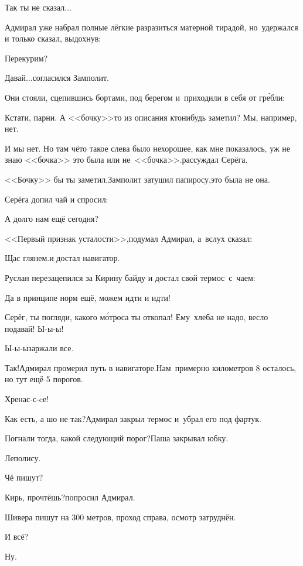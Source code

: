 \diagdash Так ты не сказал$\ldots$

Адмирал уже набрал полные лёгкие разразиться матерной тирадой, но~удержался и только сказал, выдохнув:

\diagdash Перекурим?

\diagdash Давай$\ldots$\mdash согласился Замполит.

Они стояли, сцепившись бортами, под берегом и~приходили в себя от гр\'ебли: 

\diagdash Кстати, парни. А <<бочку>>\sdash то из описания кто\sdash нибудь заметил? Мы, например, нет. 

\diagdash И мы нет. Но там чё\sdash то такое слева было нехорошее, как мне показалось, уж не знаю <<бочка>> это была или не~<<бочка>>.\mdash рассуждал Серёга.

\diagdash <<Бочку>> бы ты заметил,\mdash Замполит затушил папиросу,\mdash это была не она.

Серёга допил чай и спросил:

\diagdash А долго нам ещё сегодня?

<<Первый признак усталости>>,\mdash подумал Адмирал, а~вслух сказал:

\diagdash Щас глянем.\mdash и достал навигатор.

Руслан перезацепился за Кирину байду и достал свой термос~с~чаем:

\diagdash Да в принципе норм ещё, можем идти и идти!

\diagdash Серёг, ты погляди, какого м\'{о}троса ты откопал! Ему~хлеба не надо, весло подавай! Ы-ы-ы!

\diagdash Ы-ы-ы\mdash заржали все.

\diagdash Так!\mdash Адмирал промерил путь в навигаторе.\mdash Нам~примерно километров 8 осталось, но тут ещё 5 порогов.

\diagdash Хренас-с-cе!

\diagdash Как есть, а шо не так?\mdash Адмирал закрыл термос и~убрал его под фартук.

\diagdash Погнали тогда, какой следующий порог?\mdash Паша закрывал юбку.

\diagdash Леполису.

\diagdash Чё пишут?

\diagdash Кирь, прочтёшь?\mdash попросил Адмирал.

\diagdash Шивера пишут на 300 метров, проход справа, осмотр затруднён.

\diagdash И всё?

\diagdash Ну.

